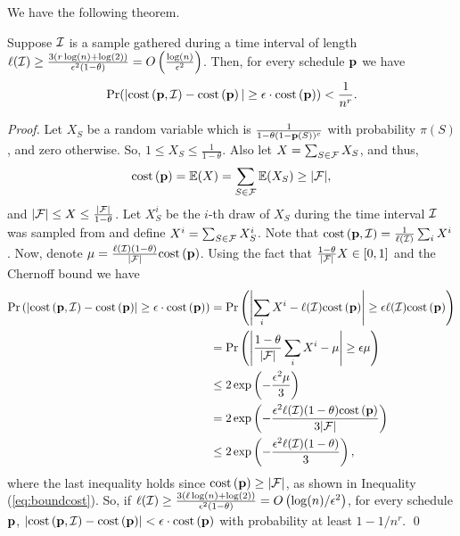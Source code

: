 We have the following theorem.
\begin{theorem}\label{thm:chernoffcost}
 Suppose $\S$ is a sample gathered during a time interval of length $\ell(\S) \geq \frac{3(r\log(n)+\log(2))}{\epsilon^2(1-\theta)} = O\paran{\frac{\log(n)}{\epsilon^2}}$. Then, for every schedule $\p$ we have
 $$\pr(|\cost{\p,\S} - \cost{\p}|\geq \epsilon\cdot\cost{\p}) < \frac{1}{n^r}.$$
\end{theorem}
\begin{proof}
Let $X_S$ be a random variable which is $\frac{1}{1-\theta(1-\p(S))^c}$ with probability $\pi(S)$, and zero otherwise. So, $1\leq X_S \leq \frac{1}{1-\theta}$. Also let  $X = \sum_{S\in \F} X_S$, and thus, 
\begin{equation}\label{eq:boundcost}
\cost{\p} = \E(X) = \sum_{S\in\F} \E(X_{S}) \geq |\F|, 
\end{equation}
and $|\F| \leq X \leq \frac{|\F|}{1-\theta}$. Let $X^i_S$ be the $i$-th draw of $X_S$ during the time interval $\S$ was sampled from and define $X^i = \sum_{S\in\F}X_S^i$. Note that 
$\cost{\p,\S} = \frac{1}{\ell(\S)}\sum_{i}X^i$. Now, denote $\mu=\frac{\ell(\S)(1-\theta)}{|\F|}\cost{\p}$. Using the fact that $\frac{1-\theta}{|\F|}X \in [0,1]$ and the Chernoff bound we have
\begin{align*}
\pr\paran{\left|\cost{\p,\S} - \cost{\p}\right| \geq \epsilon \cdot \cost{\p}} 
&= 
\pr\paran{\left|\sum_i X^i - \ell(\S)\cost{\p}\right| \geq \epsilon \ell(\S) \cost{\p}} \\
&=
\pr\paran{\left|\frac{1-\theta}{|\F|}\sum_i X^i - \mu\right| \geq \epsilon \mu} \\
&\leq 2\exp\paran{-\frac{\epsilon^2\mu}{3}}\\
&=
2\exp\paran{-\frac{\epsilon^2 \ell(\S) (1-\theta) \cost{\p}}{3|\F|}} \\
&\leq 
2\exp\paran{-\frac{\epsilon^2 \ell(\S) (1-\theta)}{3}},
\end{align*}
where the last inequality holds since $\cost{\p}\geq |\F|$, as shown in Inequality (\ref{eq:boundcost}).
So, if $\ell(\S) \geq \frac{3 (\ell \log(n)+\log(2))}{\epsilon^2(1-\theta)} = O\paran{\log(n)/\epsilon^2}$, for every schedule $\p$, $\left|\cost{\p,\S} - \cost{\p}\right| < \epsilon \cdot \cost{\p}$ with probability at least $1-1/n^r$.
\qed
\end{proof}

